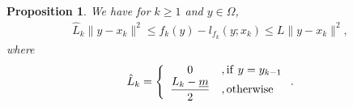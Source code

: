 \documentclass[11pt]{article}
\newtheorem{proposition}[thm]{Proposition}
\begin{document}
\begin{proposition}\label{prop:upperlowerboundfk}
We have for $k \geq 1$ and $y \in \Omega$,
\begin{eqnarray*}
\hat{L}_k \| y - x_k \|^2 \leq f_{k}(y) - l_{f_{k}}(y; x_k) \leq L \| y - x_k \|^2,
\end{eqnarray*}
where
\begin{eqnarray*}
\hat{L}_k = \left\{ \begin{array}{cl}
			0 & ,{\rm{if}}\ y = y_{k-1} \\
			\displaystyle \frac{L_k - \underline{m}}{2} & ,{\rm{otherwise}}
			\end{array} \right..
\end{eqnarray*}
\end{proposition}
\end{document}
